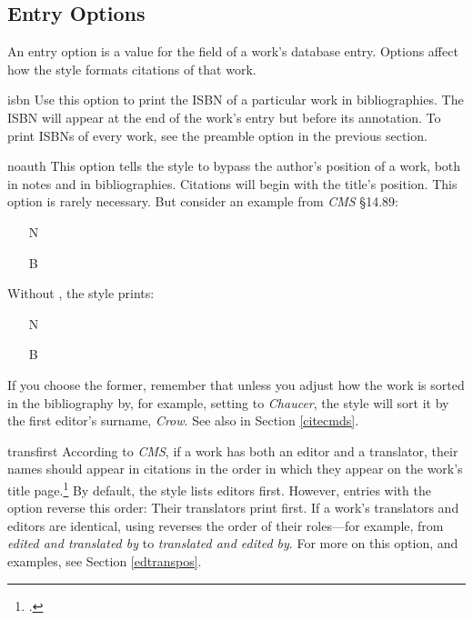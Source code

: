 \documentclass[11pt,letterpaper,oneside]{article}
\begin{document}
\subsection{Entry Options}
\label{entryops}

An entry option is a value for the  field of a
work's database entry. Options affect how the style formats citations
of that work.

\begin{marglist}

\item[isbn] Use this option to print the ISBN of a particular work in
bibliographies. The ISBN will appear at the end of the work's entry
but before its annotation. To print ISBNs of every work, see the
 preamble option in the previous section.

\item[noauth] This option tells the style to bypass the author's
position of a work, both in notes and in bibliographies. Citations
will begin with the title's position. This option is rarely necessary.
But consider an example from \textit{CMS} \S14.89:

\begin{itemize}
\item[N] 

\item[B] 
\end{itemize}

\noindent Without , the style prints:

\begin{itemize}
\item[N] 

\item[B] 
\end{itemize}

\noindent If you choose the former, remember that unless you adjust
how the work is sorted in the bibliography by, for example, setting
 to \textit{Chaucer}, the style will sort it by the
first editor's surname, \textit{Crow}. See also  in Section
\ref{citecmds}.

\item[transfirst] According to \textit{CMS}, if a work has both an
editor and a translator, their names should appear in citations in the
order in which they appear on the work's title
page.\footcite[\S14.88]{chicago2010} By default, the style lists
editors first. However, entries with the option 
reverse this order: Their translators print first. If a work's
translators and editors are identical, using 
reverses the order of their roles---for example, from \textit{edited
and translated by} to \textit{translated and edited by}. For more on
this option, and examples, see Section \ref{edtranspos}.

\end{marglist}
\end{document}
